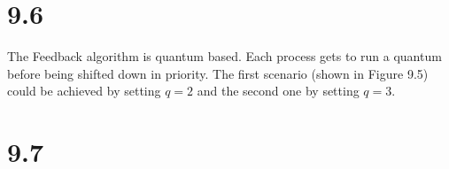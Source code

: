 \documentclass[12pt]{article}
\begin{document}
\section*{9.6}
The Feedback algorithm is quantum based. Each process gets to run a quantum before being shifted down in priority. The first scenario (shown in Figure 9.5) could be achieved by setting $q = 2$ and the second one by setting $q = 3$.

\section*{9.7}
\end{document}
